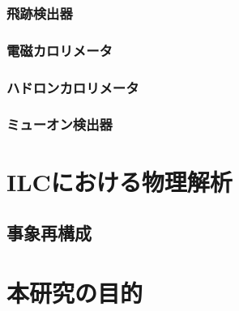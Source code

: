 \subsubsection{飛跡検出器}

\subsubsection{電磁カロリメータ}

\subsubsection{ハドロンカロリメータ}

\subsubsection{ミューオン検出器}

\section{ILCにおける物理解析}

\subsection{事象再構成}

\section{本研究の目的}